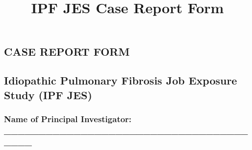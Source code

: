 \documentclass[a4paper,10pt]{article}
\begin{document}
 \newpage\title{\bf IPF JES Case Report Form}
 \date{}
 
 
 \pagestyle{fancy}
 
 
  \begin{centering} 
 \section*{CASE REPORT FORM}
 \end{centering}

 \subsection*{Idiopathic Pulmonary Fibrosis Job Exposure Study (IPF JES)}

 \vspace{0.2cm}

 \subsubsection*{Name of Principal Investigator: \_\_\_\_\_\_\_\_\_\_\_\_\_\_\_\_\_\_\_\_\_\_\_\_\_\_\_\_\_\_\_\_\_\_\_\_\_\_\_}

 \vspace{0.6cm}
\end{document}
